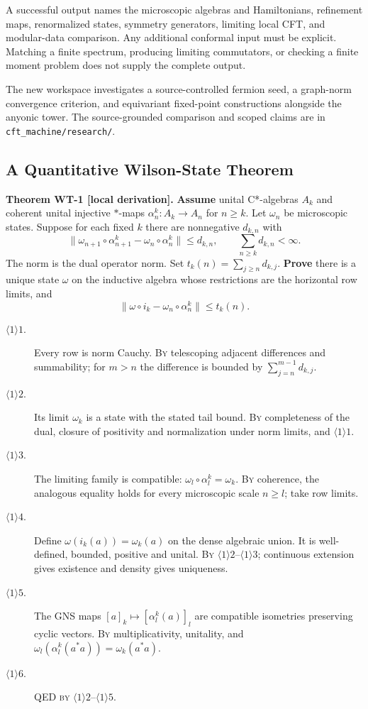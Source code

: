 A successful output names the microscopic algebras and Hamiltonians,
refinement maps, renormalized states, symmetry generators, limiting local
CFT, and modular-data comparison. Any additional conformal input must be
explicit. Matching a finite spectrum, producing limiting commutators,
or checking a finite moment problem does not supply the complete output.

The new workspace investigates a source-controlled fermion seed, a
graph-norm convergence criterion, and equivariant fixed-point constructions
alongside the anyonic tower. The source-grounded comparison and scoped
claims are in \texttt{cft\_machine/research/}.

\subsection{A Quantitative Wilson-State Theorem}

\textbf{Theorem WT-1 [local derivation].}
\textbf{Assume} unital C*-algebras $A_k$ and coherent unital injective
$*$-maps $\alpha_n^k:A_k\to A_n$ for $n\ge k$. Let $\omega_n$ be
microscopic states. Suppose for each fixed $k$ there are nonnegative
$d_{k,n}$ with
\[
 \|\omega_{n+1}\circ\alpha_{n+1}^k-
       \omega_n\circ\alpha_n^k\|\le d_{k,n},\qquad
 \sum_{n\ge k}d_{k,n}<\infty.
\]
The norm is the dual operator norm. Set $t_k(n)=\sum_{j\ge n}d_{k,j}$.
\textbf{Prove} there is a unique state $\omega$ on the inductive algebra
whose restrictions are the horizontal row limits, and
\[
 \|\omega\circ i_k-\omega_n\circ\alpha_n^k\|\le t_k(n).
\]

\begin{description}
\item[$\langle1\rangle1$.] Every row is norm Cauchy.
\textsc{By} telescoping adjacent differences and summability; for $m>n$
the difference is bounded by $\sum_{j=n}^{m-1}d_{k,j}$.
\item[$\langle1\rangle2$.] Its limit $\omega_k$ is a state with the
stated tail bound. \textsc{By} completeness of the dual, closure of
positivity and normalization under norm limits, and $\langle1\rangle1$.
\item[$\langle1\rangle3$.] The limiting family is compatible:
$\omega_l\circ\alpha_l^k=\omega_k$. \textsc{By} coherence, the analogous
equality holds for every microscopic scale $n\ge l$; take row limits.
\item[$\langle1\rangle4$.] Define $\omega(i_k(a))=\omega_k(a)$ on the
dense algebraic union. It is well-defined, bounded, positive and unital.
\textsc{By} $\langle1\rangle2$--$\langle1\rangle3$; continuous extension
gives existence and density gives uniqueness.
\item[$\langle1\rangle5$.] The GNS maps $[a]_k\mapsto[\alpha_l^k(a)]_l$
are compatible isometries preserving cyclic vectors. \textsc{By}
multiplicativity, unitality, and
$\omega_l(\alpha_l^k(a^*a))=\omega_k(a^*a)$.
\item[$\langle1\rangle6$.] QED \textsc{by}
$\langle1\rangle2$--$\langle1\rangle5$.
\end{description}

